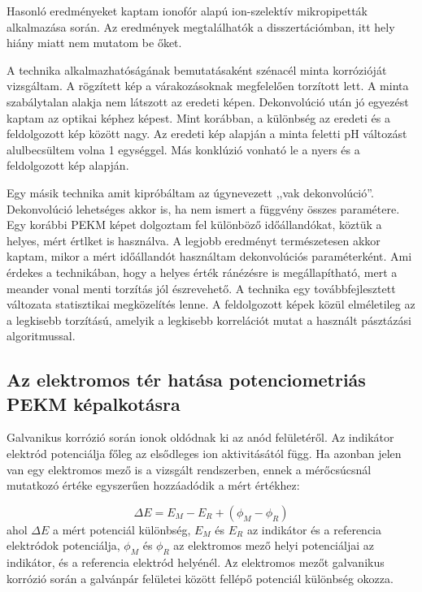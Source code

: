 Hasonló eredményeket kaptam ionofór alapú ion-szelektív mikropipetták alkalmazása során.
Az eredmények megtalálhatók a disszertációmban, itt hely hiány miatt nem mutatom be őket.

A technika alkalmazhatóságának bemutatásaként szénacél minta korrózióját vizsgáltam.
A rögzített kép a várakozásoknak megfelelően torzított lett.
A minta szabálytalan alakja nem látszott az eredeti képen.
Dekonvolúció után jó egyezést kaptam az optikai képhez képest.
Mint korábban, a különbség az eredeti és a feldolgozott kép között nagy.
Az eredeti kép alapján a minta feletti pH változást alulbecsültem volna 1 egységgel.
Más konklúzió vonható le a nyers és a feldolgozott kép alapján.

Egy másik technika amit kipróbáltam az úgynevezett ,,vak dekonvolúció''.
Dekonvolúció lehetséges akkor is, ha nem ismert a függvény összes paramétere.
Egy korábbi PEKM képet dolgoztam fel különböző időállandókat, köztük a helyes, mért értlket is  használva. 
A legjobb eredményt természetesen akkor kaptam, mikor a mért időállandót használtam dekonvolúciós paraméterként.
Ami érdekes a technikában, hogy a helyes érték ránézésre is megállapítható, mert a meander vonal menti torzítás jól észrevehető.
A technika egy továbbfejlesztett változata statisztikai megközelítés lenne.
A feldolgozott képek közül elméletileg az a legkisebb torzítású, amelyik a legkisebb korrelációt mutat a használt pásztázási algoritmussal.

\subsection{Az elektromos tér hatása potenciometriás PEKM képalkotásra}
Galvanikus korrózió során ionok oldódnak ki az anód felületéről.
Az indikátor elektród potenciálja főleg az elsődleges ion aktivitásától függ.
Ha azonban jelen van egy elektromos mező is a vizsgált rendszerben, ennek a mérőcsúcsnál mutatkozó értéke egyszerűen hozzáadódik a mért értékhez:

\begin{equation}
\Delta E=E_M-E_R + (\phi_M - \phi_R)
\label{eq:potential}
\end{equation}
ahol $\Delta E$ a mért potenciál különbség, $E_M$ és $E_R$ az indikátor és a referencia elektródok potenciálja, $\phi_M$ és $\phi_R$ az elektromos mező helyi potenciáljai az indikátor, és a referencia elektród helyénél.
Az elektromos mezőt galvanikus korrózió során a galvánpár felületei között fellépő potenciál különbség okozza.

